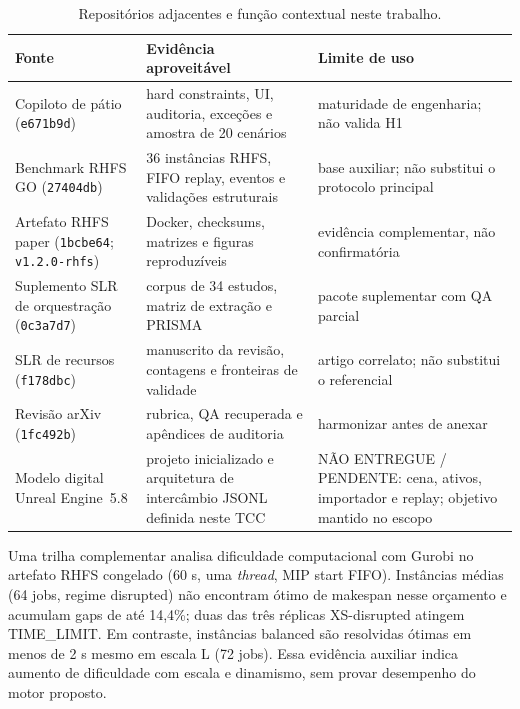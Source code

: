 \documentclass[
  12pt,
  oneside,
  a4paper,
  sumario=tradicional,
  brazil
]{abntex2}
\begin{document}
\begin{apendicesenv}
\begin{table}[H]
\centering
\scriptsize
\setlength{\tabcolsep}{4pt}
\renewcommand{\arraystretch}{1.14}
\begin{tabularx}{\textwidth}{@{}P{0.30\textwidth}P{0.36\textwidth}Y@{}}
\toprule
{}
\textbf{Fonte} & \textbf{Evid\^encia aproveit\'avel} & \textbf{Limite de uso} \\
\midrule
Copiloto de p\'atio (\texttt{e671b9d}) & hard constraints, UI, auditoria, exce\c{c}\~oes e amostra de 20 cen\'arios & maturidade de engenharia; n\~ao valida H1 \\
\addlinespace
Benchmark RHFS GO (\texttt{27404db}) & 36 inst\^ancias RHFS, FIFO replay, eventos e valida\c{c}\~oes estruturais & base auxiliar; n\~ao substitui o protocolo principal \\
\addlinespace
Artefato RHFS paper (\texttt{1bcbe64}; \texttt{v1.2.0-rhfs}) & Docker, checksums, matrizes e figuras reproduz\'iveis & evid\^encia complementar, n\~ao confirmat\'oria \\
\addlinespace
Suplemento SLR de orquestra\c{c}\~ao (\texttt{0c3a7d7}) & corpus de 34 estudos, matriz de extra\c{c}\~ao e PRISMA & pacote suplementar com QA parcial \\
\addlinespace
SLR de recursos (\texttt{f178dbc}) & manuscrito da revis\~ao, contagens e fronteiras de validade & artigo correlato; n\~ao substitui o referencial \\
\addlinespace
Revis\~ao arXiv (\texttt{1fc492b}) & rubrica, QA recuperada e ap\^endices de auditoria & harmonizar antes de anexar \\
\addlinespace
Modelo digital Unreal Engine~5.8 & projeto inicializado e arquitetura de interc\^ambio JSONL definida neste TCC & N\~AO ENTREGUE / PENDENTE: cena, ativos, importador e replay; objetivo mantido no escopo \\
\bottomrule
\end{tabularx}
\caption[Reposit\'orios adjacentes da pesquisa]{Reposit\'orios adjacentes e fun\c{c}\~ao contextual neste trabalho.}
\label{tab:repos-adjacentes}
\end{table}

Uma trilha complementar analisa dificuldade computacional com Gurobi \parencite{gurobioptimizationllcGurobiOptimizerReference2024a} no artefato RHFS congelado (60 s, uma \textit{thread}, MIP start FIFO). Inst\^ancias m\'edias (64 jobs, regime disrupted) n\~ao encontram \'otimo de makespan nesse or\c{c}amento e acumulam gaps de at\'e 14,4\%; duas das tr\^es r\'eplicas XS-disrupted atingem TIME\_LIMIT. Em contraste, inst\^ancias balanced s\~ao resolvidas \'otimas em menos de 2 s mesmo em escala L (72 jobs). Essa evid\^encia auxiliar indica aumento de dificuldade com escala e dinamismo, sem provar desempenho do motor proposto.


\end{apendicesenv}
\end{document}
